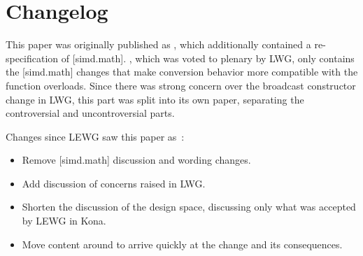 \section{Changelog}
This paper was originally published as \parencite{P3844R2}, which additionally
contained a re-specification of [simd.math].
\parencite{P3844R4}, which was voted to plenary by LWG, only contains the [simd.math]
changes that make conversion behavior more compatible with the 
function overloads.
Since there was strong concern over the  broadcast constructor
change in LWG, this part was split into its own paper, separating the
controversial and uncontroversial parts.

Changes since LEWG saw this paper as~\cite{P3844R1}:
\begin{itemize}
  \item Remove [simd.math] discussion and wording changes.
  \item Add discussion of concerns raised in LWG\@.
  \item Shorten the discussion of the design space, discussing only what was
    accepted by LEWG in Kona.
  \item Move content around to arrive quickly at the change and its consequences.
\end{itemize}
